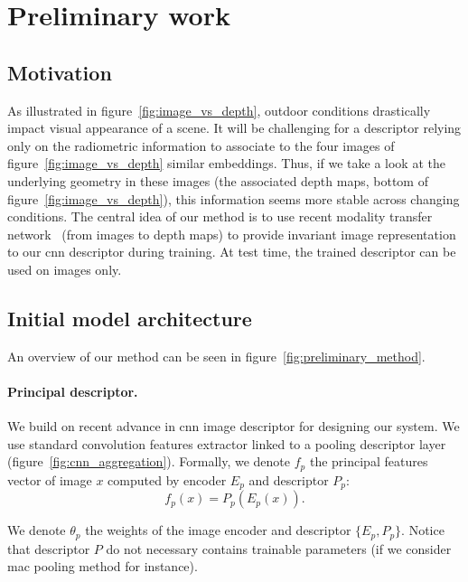 \section{Preliminary work}
\label{sec:preliminary_work}

\subsection{Motivation}

As illustrated in figure~\ref{fig:image_vs_depth}, outdoor conditions drastically impact visual appearance of a scene. It will be challenging for a descriptor relying only on the radiometric information to associate to the four images of figure~\ref{fig:image_vs_depth} similar embeddings. Thus, if we take a look at the underlying geometry in these images (\ie the associated depth maps, bottom of figure~\ref{fig:image_vs_depth}), this information seems more stable across changing conditions. The central idea of our method is to use recent modality transfer network~\citep{Eigen2014, Godard2017, Mahjourian2018} (from images to depth maps) to provide invariant image representation to our \ac{cnn} descriptor during training. At test time, the trained descriptor can be used on images only.

\subsection{Initial model architecture}

An overview of our method can be seen in figure~\ref{fig:preliminary_method}.

\paragraph{Principal descriptor.}
We build on recent advance in \ac{cnn} image descriptor for designing our system. We use standard convolution features extractor linked to a pooling descriptor layer (figure~\ref{fig:cnn_aggregation}). Formally, we denote $f_p$ the principal features vector of image $x$ computed by encoder $E_p$ and descriptor $P_p$:
\begin{equation}
	\label{eq:desc_details}
	f_p(x) = P_p(E_p(x)).
\end{equation}

We denote $\theta_{p}$ the weights of the image encoder and descriptor $\{E_p, P_p\}$. Notice that descriptor $P$ do not necessary contains trainable parameters (if we consider \ac{mac} pooling method for instance).

